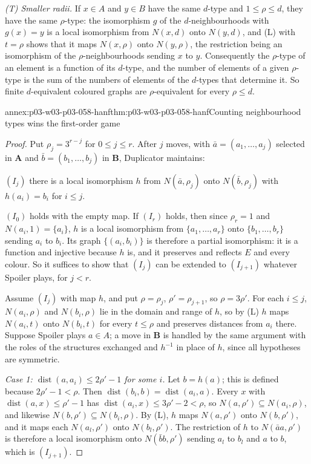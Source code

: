 \emph{(T) Smaller radii.} If \(x\in A\) and \(y\in B\) have the same
\(d\)-type and \(1\le\rho\le d\), they have the same \(\rho\)-type: the
isomorphism \(g\) of the \(d\)-neighbourhoods with \(g(x)=y\) is a local
isomorphism from \(N(x,d)\) onto \(N(y,d)\), and (L) with \(t=\rho\) shows
that it maps \(N(x,\rho)\) onto \(N(y,\rho)\), the restriction being an
isomorphism of the \(\rho\)-neighbourhoods sending \(x\) to \(y\).
Consequently the \(\rho\)-type of an element is a function of its
\(d\)-type, and the number of elements of a given \(\rho\)-type is the sum of
the numbers of elements of the \(d\)-types that determine it. So finite
\(d\)-equivalent coloured graphs are \(\rho\)-equivalent for every
\(\rho\le d\).

\begin{annexitem}{annex:p03-w03-p03-058-hanf}{thm:p03-w03-p03-058-hanf}{Counting neighbourhood types wins the first-order game}
\begin{proof}
Put \(\rho_j=3^{r-j}\) for \(0\le j\le r\). After \(j\) moves, with
\(\bar a=(a_1,\ldots,a_j)\) selected in \(\mathbf A\) and
\(\bar b=(b_1,\ldots,b_j)\) in \(\mathbf B\), Duplicator maintains:

\((I_j)\) there is a local isomorphism \(h\) from \(N(\bar a,\rho_j)\) onto
\(N(\bar b,\rho_j)\) with \(h(a_i)=b_i\) for \(i\le j\).

\((I_0)\) holds with the empty map. If \((I_r)\) holds, then since
\(\rho_r=1\) and \(N(a_i,1)=\{a_i\}\), \(h\) is a local isomorphism from
\(\{a_1,\ldots,a_r\}\) onto \(\{b_1,\ldots,b_r\}\) sending \(a_i\) to
\(b_i\). Its graph \(\{(a_i,b_i)\}\) is therefore a partial isomorphism: it
is a function and injective because \(h\) is, and it preserves and
reflects \(E\) and every colour. So it suffices to show that \((I_j)\) can
be extended to \((I_{j+1})\) whatever Spoiler plays, for \(j<r\).

Assume \((I_j)\) with map \(h\), and put \(\rho=\rho_j\),
\(\rho'=\rho_{j+1}\), so \(\rho=3\rho'\). For each \(i\le j\),
\(N(a_i,\rho)\) and \(N(b_i,\rho)\) lie in the domain and range of \(h\), so
by (L) \(h\) maps \(N(a_i,t)\) onto \(N(b_i,t)\) for every \(t\le\rho\) and
preserves distances from \(a_i\) there. Suppose Spoiler plays \(a\in A\); a
move in \(\mathbf B\) is handled by the same argument with the roles of the
structures exchanged and \(h^{-1}\) in place of \(h\), since all hypotheses
are symmetric.

\emph{Case 1: \(\operatorname{dist}(a,a_i)\le2\rho'-1\) for some \(i\).}
Let \(b=h(a)\); this is defined because \(2\rho'-1<\rho\). Then
\(\operatorname{dist}(b_i,b)=\operatorname{dist}(a_i,a)\). Every \(x\) with
\(\operatorname{dist}(a,x)\le\rho'-1\) has
\(\operatorname{dist}(a_i,x)\le3\rho'-2<\rho\), so
\(N(a,\rho')\subseteq N(a_i,\rho)\), and likewise
\(N(b,\rho')\subseteq N(b_i,\rho)\). By (L), \(h\) maps \(N(a,\rho')\) onto
\(N(b,\rho')\), and it maps each \(N(a_l,\rho')\) onto \(N(b_l,\rho')\).
The restriction of \(h\) to \(N(\bar aa,\rho')\) is therefore a local
isomorphism onto \(N(\bar bb,\rho')\) sending \(a_l\) to \(b_l\) and \(a\)
to \(b\), which is \((I_{j+1})\).


\end{proof}
\end{annexitem}
